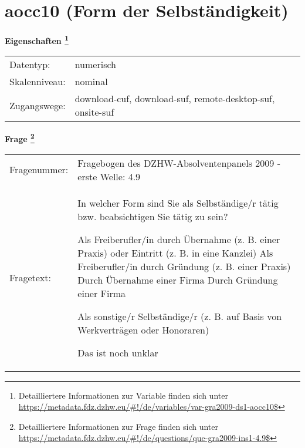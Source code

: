 
    \setcounter{footnote}{0}

    \vspace*{-1.8cm}
	\section{aocc10 (Form der Selbständigkeit)}
	\label{section:aocc10}



    \vspace*{0.5cm}
    \noindent\textbf{Eigenschaften
	\footnote{Detailliertere Informationen zur Variable finden sich unter
		\url{https://metadata.fdz.dzhw.eu/\#!/de/variables/var-gra2009-ds1-aocc10$}}}\\
	\begin{tabularx}{\hsize}{@{}lX}
	Datentyp: & numerisch \\
	Skalenniveau: & nominal \\
	Zugangswege: &
	  download-cuf, 
	  download-suf, 
	  remote-desktop-suf, 
	  onsite-suf
 \\
    \end{tabularx}



				\vspace*{0.5cm}
                \noindent\textbf{Frage
	                \footnote{Detailliertere Informationen zur Frage finden sich unter
		              \url{https://metadata.fdz.dzhw.eu/\#!/de/questions/que-gra2009-ins1-4.9$}}}\\
				\begin{tabularx}{\hsize}{@{}lX}
					Fragenummer: &
					  Fragebogen des DZHW-Absolventenpanels 2009 - erste Welle:
					  4.9
 \\
					Fragetext: & In welcher Form sind Sie als Selbständige/r tätig bzw. beabsichtigen Sie tätig zu sein?\par  Als Freiberufler/in durch Übernahme (z. B. einer Praxis) oder Eintritt (z. B. in eine Kanzlei) Als Freiberufler/in durch Gründung (z. B. einer Praxis) Durch Übernahme einer Firma Durch Gründung einer Firma\par  Als sonstige/r Selbständige/r (z. B. auf Basis von Werkverträgen oder Honoraren)\par  Das ist noch unklar \\
				\end{tabularx}





